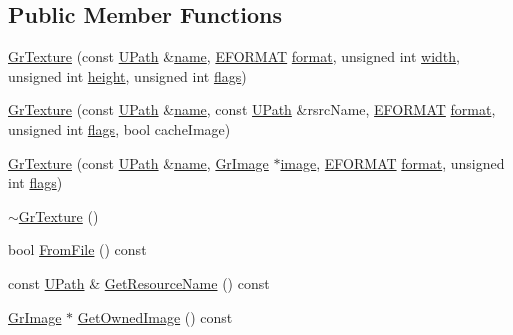 \subsection*{Public Member Functions}
\begin{CompactItemize}
\item 
\hyperlink{class_gr_texture_5f32f1b6d6f4915477b3c7faaa16d709}{GrTexture} (const \hyperlink{class_u_path}{UPath} \&\hyperlink{glext__bak_8h_bb62efe59ccdd153ce42e1a418352209}{name}, \hyperlink{class_gr_texture_base_82c606022e93566ba55fe4cd3beb687c}{EFORMAT} \hyperlink{glext__bak_8h_e2d3db041c6004a67047659b42f73a44}{format}, unsigned int \hyperlink{wglext_8h_e6531b1788ca42a9ae8155b0c52e7630}{width}, unsigned int \hyperlink{wglext_8h_b2e63df950c3789599e1e43f477bc9e3}{height}, unsigned int \hyperlink{_u_t_message_8h_0a3c0b351ab09281b662a9ff4f900a53}{flags})
\item 
\hyperlink{class_gr_texture_c134a41f404fb47416c5a0e374792737}{GrTexture} (const \hyperlink{class_u_path}{UPath} \&\hyperlink{glext__bak_8h_bb62efe59ccdd153ce42e1a418352209}{name}, const \hyperlink{class_u_path}{UPath} \&rsrcName, \hyperlink{class_gr_texture_base_82c606022e93566ba55fe4cd3beb687c}{EFORMAT} \hyperlink{glext__bak_8h_e2d3db041c6004a67047659b42f73a44}{format}, unsigned int \hyperlink{_u_t_message_8h_0a3c0b351ab09281b662a9ff4f900a53}{flags}, bool cacheImage)
\item 
\hyperlink{class_gr_texture_7705b602e3918639f58b799495529c68}{GrTexture} (const \hyperlink{class_u_path}{UPath} \&\hyperlink{glext__bak_8h_bb62efe59ccdd153ce42e1a418352209}{name}, \hyperlink{class_gr_image}{GrImage} $\ast$\hyperlink{glext__bak_8h_8943555672bc4b8056204eb92329cafa}{image}, \hyperlink{class_gr_texture_base_82c606022e93566ba55fe4cd3beb687c}{EFORMAT} \hyperlink{glext__bak_8h_e2d3db041c6004a67047659b42f73a44}{format}, unsigned int \hyperlink{_u_t_message_8h_0a3c0b351ab09281b662a9ff4f900a53}{flags})
\item 
\hyperlink{class_gr_texture_13f13092919de67e0cfc6bd14cf94ca1}{$\sim$GrTexture} ()
\item 
bool \hyperlink{class_gr_texture_3467681d14e81406629f9b611016aaa9}{FromFile} () const 
\item 
const \hyperlink{class_u_path}{UPath} \& \hyperlink{class_gr_texture_9dd7315f4f9ce115291f8d3fdc149594}{GetResourceName} () const 
\item 
\hyperlink{class_gr_image}{GrImage} $\ast$ \hyperlink{class_gr_texture_abe145a3b9a78ffcbb468ed493c97357}{GetOwnedImage} () const 
\item 

\end{CompactItemize}
